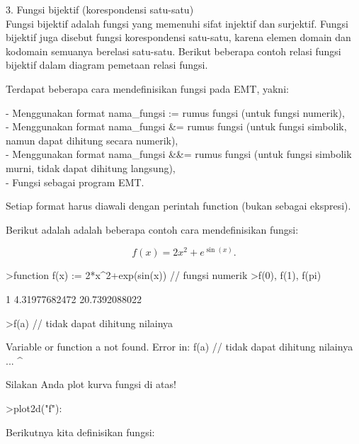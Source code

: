 \documentclass[a4paper,10pt]{article}
\begin{document}
\begin{eulernotebook}
\begin{eulercomment}
\begin{eulercomment}
\begin{eulercomment}
\begin{eulercomment}
\begin{eulercomment}
\begin{eulercomment}
\begin{eulercomment}
3. Fungsi bijektif (korespondensi satu-satu)\\
Fungsi bijektif adalah fungsi yang memenuhi sifat injektif dan
surjektif. Fungsi bijektif juga disebut fungsi korespondensi
satu-satu, karena elemen domain dan kodomain semuanya berelasi
satu-satu. Berikut beberapa contoh relasi fungsi bijektif dalam
diagram pemetaan relasi fungsi.
\end{eulercomment}
\begin{eulercomment}
Terdapat beberapa cara mendefinisikan fungsi pada EMT, yakni:

- Menggunakan format nama\_fungsi := rumus fungsi (untuk fungsi
numerik),\\
- Menggunakan format nama\_fungsi \&= rumus fungsi (untuk fungsi
simbolik, namun dapat dihitung secara numerik),\\
- Menggunakan format nama\_fungsi \&\&= rumus fungsi (untuk fungsi
simbolik murni, tidak dapat dihitung langsung),\\
- Fungsi sebagai program EMT.

Setiap format harus diawali dengan perintah function (bukan sebagai
ekspresi).

Berikut adalah adalah beberapa contoh cara mendefinisikan fungsi:

\end{eulercomment}
\begin{eulerformula}
\[
f(x)=2x^2+e^{\sin(x)}.
\]
\end{eulerformula}
\begin{eulerprompt}
>function f(x) := 2*x^2+exp(sin(x)) // fungsi numerik
>f(0), f(1), f(pi)
\end{eulerprompt}
\begin{euleroutput}
  1
  4.31977682472
  20.7392088022
\end{euleroutput}
\begin{eulerprompt}
>f(a) // tidak dapat dihitung nilainya
\end{eulerprompt}
\begin{euleroutput}
  Variable or function a not found.
  Error in:
  f(a) // tidak dapat dihitung nilainya ...
     ^
\end{euleroutput}
\begin{eulercomment}
Silakan Anda plot kurva fungsi di atas!

\end{eulercomment}
\begin{eulerprompt}
>plot2d("f"):
\end{eulerprompt}
\begin{eulercomment}
Berikutnya kita definisikan fungsi:


\end{eulercomment}
\end{eulercomment}
\end{eulercomment}
\end{eulercomment}
\end{eulercomment}
\end{eulercomment}
\end{eulercomment}
\end{eulernotebook}
\end{document}
